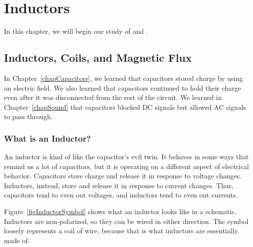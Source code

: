 \chapter{Inductors}
\label{chapInductors}

%

In this chapter, we will begin our study of  and .

\section{Inductors, Coils, and Magnetic Flux}

In Chapter~\ref{chapCapacitors}, we learned that capacitors stored charge by using an electric field.
We also learned that capacitors continued to hold their charge even after it was disconnected from the rest of the circuit.
We learned in Chapter~\ref{chapSound} that capacitors blocked DC signals but allowed AC signals to pass through.

\subsection{What is an Inductor?}
An inductor is kind of like the capacitor's evil twin.  
It behaves in some ways that remind us a lot of capacitors, but it is operating on a different aspect of electrical behavior.
Capacitors store charge and release it in response to voltage changes.
Inductors, instead, store  and release it in response to current changes.
Thus, capacitors tend to even out voltages, and inductors tend to even out currents.


Figure~\ref{figInductorSymbol} shows what an inductor looks like in a schematic.
Inductors are non-polarized, so they can be wired in either direction.
The symbol loosely represents a coil of wire, because that is what inductors are essentially made of.

